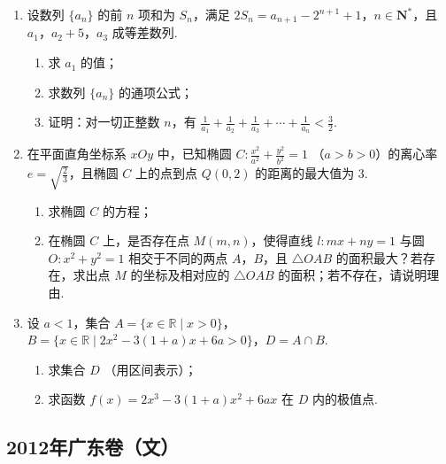 \begin{description}
\begin{enumerate}[leftmargin=5pt]
        \item 设数列 \(\{a_{n}\}\) 的前 \(n\) 项和为 \(S_{n}\)，满足 \(2S_{n} = a_{n + 1} - 2^{n + 1} + 1\)，\(n \in \mathbf{N}^{*}\)，且 \(a_{1}\)，\(a_{2} + 5\)，\(a_{3}\) 成等差数列.
\begin{enumerate}
\item 求 \(a_{1}\) 的值；
\item 求数列 \(\{a_{n}\}\) 的通项公式；
\item 证明：对一切正整数 \(n\)，有 \(\frac{1}{a_1} + \frac{1}{a_2} + \frac{1}{a_3} + \cdots + \frac{1}{a_n} < \frac{3}{2}\).
\end{enumerate}

        \item 在平面直角坐标系 \(xOy\) 中，已知椭圆 \(C: \frac{x^{2}}{a^{2}} + \frac{y^{2}}{b^{2}} = 1\) （\(a > b > 0\)）的离心率 \(e = \sqrt{\frac{2}{3}}\)，且椭圆 \(C\) 上的点到点 \(Q(0,2)\) 的距离的最大值为 \(3\).
\begin{enumerate}
\item 求椭圆 \(C\) 的方程；
\item 在椭圆 \(C\) 上，是否存在点 \(M(m, n)\)，使得直线 \(l: mx + ny = 1\) 与圆 \(O: x^2 + y^2 = 1\) 相交于不同的两点 \(A\)，\(B\)，且 \(\triangle OAB\) 的面积最大？若存在，求出点 \(M\) 的坐标及相对应的 \(\triangle OAB\) 的面积；若不存在，请说明理由.
\end{enumerate}

        \item 设 \(a < 1\)，集合 \(A = \{x \in \mathbb{R} \mid x > 0\}\)，\(B = \{x \in \mathbb{R} \mid 2x^2 - 3(1 + a)x + 6a > 0\}\)，\(D = A \cap B\).
\begin{enumerate}
\item 求集合 \(D\) （用区间表示）；
\item 求函数 \( f(x) = 2x^3 - 3(1 + a)x^2 + 6ax \) 在 \(D\) 内的极值点.
\end{enumerate}

    \end{enumerate}

\end{description}


\subsection{2012年广东卷（文）}\label{gk:2012年广东卷（文）}

